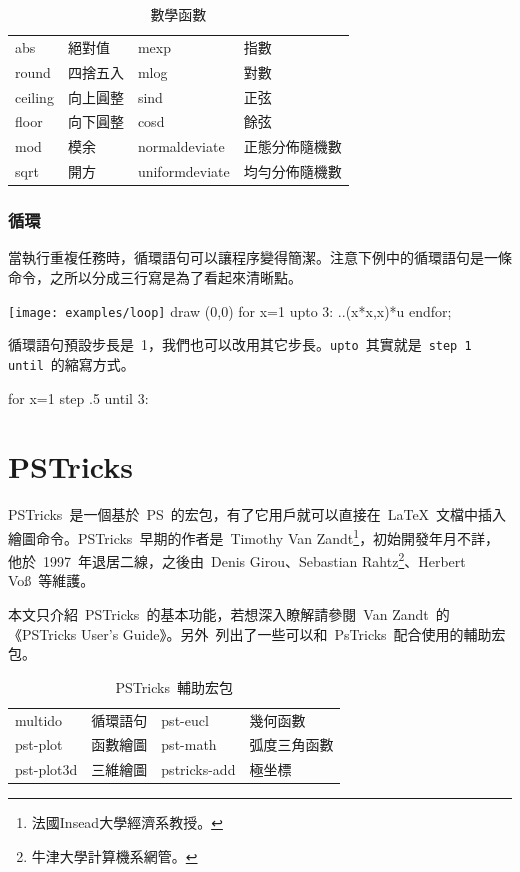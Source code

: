 \begin{table}[htbp]
\caption{數學函數}
\label{tab:math_function}
\centering
\begin{tabular}{llll}
    \toprule
    abs     & 絕對值   & mexp & 指數 \\
    round   & 四捨五入 & mlog & 對數 \\
    ceiling & 向上圓整 & sind & 正弦 \\
    floor   & 向下圓整 & cosd & 餘弦 \\
    mod     & 模余     & normaldeviate & 正態分佈隨機數 \\
    sqrt    & 開方     & uniformdeviate & 均勻分佈隨機數 \\
    \bottomrule
\end{tabular}
\end{table}

\subsubsection{循環}
當執行重複任務時，循環語句可以讓程序變得簡潔。注意下例中的循環語句是一條命令，之所以分成三行寫是為了看起來清晰點。

\begin{fdemo}{\texttt{[image: examples/loop]}}
draw (0,0) %
for x=1 upto 3: 
    ..(x*x,x)*u 
endfor;
\end{fdemo}

循環語句預設步長是~1，我們也可以改用其它步長。\verb|upto|~其實就是~\verb|step 1 until|~的縮寫方式。
\begin{code}
for x=1 step .5 until 3: 
\end{code}

\section{PSTricks}
\label{sec:pstricks}

PSTricks~是一個基於~PS~的宏包，有了它用戶就可以直接在~\LaTeX~文檔中插入繪圖命令。PSTricks~早期的作者是~Timothy Van Zandt\footnote{法國Insead大學經濟系教授。}，初始開發年月不詳，他於~1997~年退居二線，之後由~Denis Girou、Sebastian Rahtz\footnote{牛津大學計算機系網管。}、Herbert Voß~等維護。

本文只介紹~PSTricks~的基本功能，若想深入瞭解請參閱~Van Zandt~的《PSTricks User's Guide》\citep{Zandt_2007}。另外~列出了一些可以和~PsTricks~配合使用的輔助宏包。

\begin{table}[htbp]
\caption{PSTricks~輔助宏包}
\label{tab:pst_add}
\centering
\begin{tabular}{llll}
    \toprule
    multido & 循環語句    & pst-eucl & 幾何函數 \\    
    pst-plot & 函數繪圖   & pst-math & 弧度三角函數 \\
    pst-plot3d & 三維繪圖 & pstricks-add & 極坐標 \\  
    \bottomrule
\end{tabular}
\end{table}

